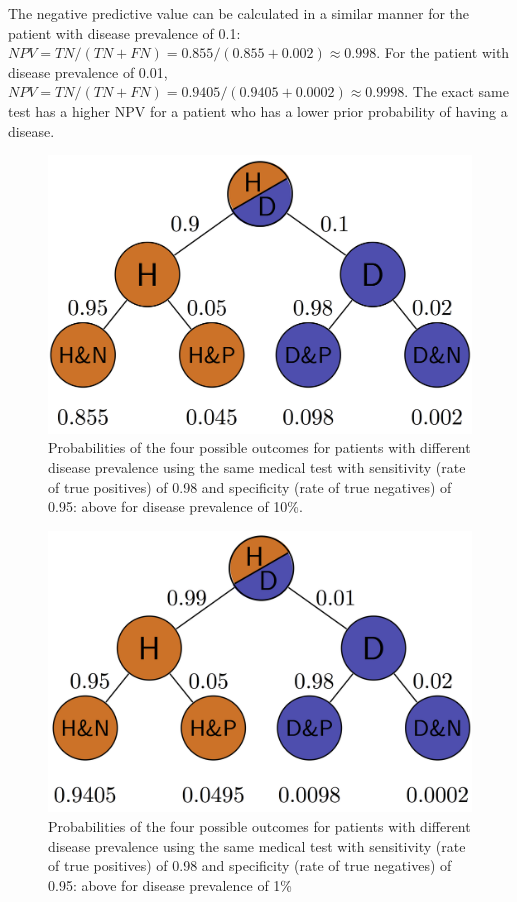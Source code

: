 \documentclass[
  letterpaper,
  DIV=11,
  numbers=noendperiod]{scrreprt}
\begin{document}
The negative predictive value can be calculated in a similar manner for
the patient with disease prevalence of 0.1:
\(NPV = TN/(TN+FN) = 0.855/(0.855+0.002) \approx 0.998\). For the
patient with disease prevalence of 0.01,
\(NPV = TN/(TN+FN) = 0.9405/(0.9405+0.0002) \approx 0.9998\). The exact
same test has a higher NPV for a patient who has a lower prior
probability of having a disease.

\begin{figure}

{\centering \includegraphics{./ch7/prob_tree_tikz1.png}

}

\caption{Probabilities of the four possible outcomes for patients with
different disease prevalence using the same medical test with
sensitivity (rate of true positives) of 0.98 and specificity (rate of
true negatives) of 0.95: above for disease prevalence of 10\%.}

\end{figure}

\begin{figure}

{\centering \includegraphics{./ch7/prob_tree_tikz2.png}

}

\caption{Probabilities of the four possible outcomes for patients with
different disease prevalence using the same medical test with
sensitivity (rate of true positives) of 0.98 and specificity (rate of
true negatives) of 0.95: above for disease prevalence of 1\%}

\end{figure}
\end{document}
